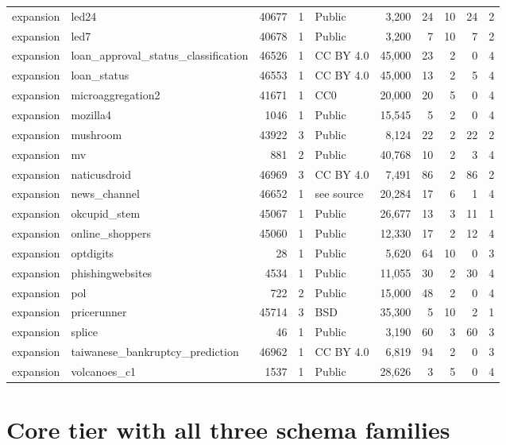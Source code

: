 \begin{table}[htbp]
\begin{adjustbox}{max width=\linewidth}
\begin{tabular}{llrrlrrrrr}
expansion & led24 & 40677 & 1 & Public & 3{,}200 & 24 & 10 & 24 & 2 \\
expansion & led7 & 40678 & 1 & Public & 3{,}200 & 7 & 10 & 7 & 2 \\
expansion & loan\_approval\_status\_classification & 46526 & 1 & CC BY 4.0 & 45{,}000 & 23 & 2 & 0 & 4 \\
expansion & loan\_status & 46553 & 1 & CC BY 4.0 & 45{,}000 & 13 & 2 & 5 & 4 \\
expansion & microaggregation2 & 41671 & 1 & CC0 & 20{,}000 & 20 & 5 & 0 & 4 \\
expansion & mozilla4 & 1046 & 1 & Public & 15{,}545 & 5 & 2 & 0 & 4 \\
expansion & mushroom & 43922 & 3 & Public & 8{,}124 & 22 & 2 & 22 & 2 \\
expansion & mv & 881 & 2 & Public & 40{,}768 & 10 & 2 & 3 & 4 \\
expansion & naticusdroid & 46969 & 3 & CC BY 4.0 & 7{,}491 & 86 & 2 & 86 & 2 \\
expansion & news\_channel & 46652 & 1 & see source & 20{,}284 & 17 & 6 & 1 & 4 \\
expansion & okcupid\_stem & 45067 & 1 & Public & 26{,}677 & 13 & 3 & 11 & 1 \\
expansion & online\_shoppers & 45060 & 1 & Public & 12{,}330 & 17 & 2 & 12 & 4 \\
expansion & optdigits & 28 & 1 & Public & 5{,}620 & 64 & 10 & 0 & 3 \\
expansion & phishingwebsites & 4534 & 1 & Public & 11{,}055 & 30 & 2 & 30 & 4 \\
expansion & pol & 722 & 2 & Public & 15{,}000 & 48 & 2 & 0 & 4 \\
expansion & pricerunner & 45714 & 3 & BSD & 35{,}300 & 5 & 10 & 2 & 1 \\
expansion & splice & 46 & 1 & Public & 3{,}190 & 60 & 3 & 60 & 3 \\
expansion & taiwanese\_bankruptcy\_prediction & 46962 & 1 & CC BY 4.0 & 6{,}819 & 94 & 2 & 0 & 3 \\
expansion & volcanoes\_c1 & 1537 & 1 & Public & 28{,}626 & 3 & 5 & 0 & 4 \\
\bottomrule
\end{tabular}
\end{adjustbox}
\end{table}

\section{Core tier with all three schema families}\label{app:core-families}

